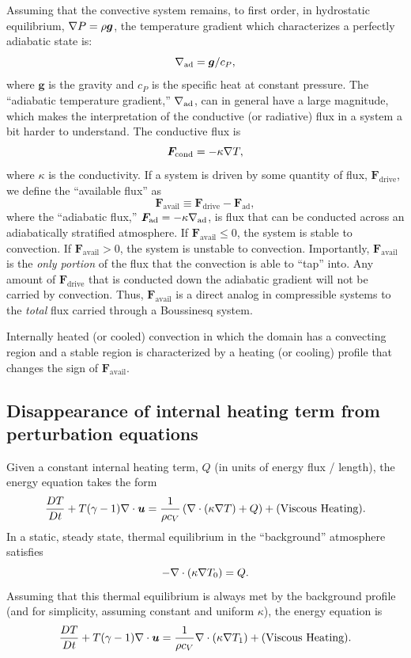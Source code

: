 Assuming that the convective system remains, to first order, in hydrostatic equilibrium, $\nabla P = \rho \bm{g}$, the temperature gradient which characterizes a perfectly adiabatic state is:
\begin{equation}
\nabla_{\text{ad}} = \bm{g}/c_P,
\end{equation}
where $\bm{g}$ is the gravity and $c_P$ is the specific heat at constant pressure.
The ``adiabatic temperature gradient,'' $\nabla_{\text{ad}}$, can in general have a large magnitude, which makes the interpretation of the conductive (or radiative) flux in a system a bit harder to understand.
The conductive flux is
\begin{equation}
\bm{F}_{\text{cond}} = -\kappa \nabla T,
\end{equation}
where $\kappa$ is the conductivity.
If a system is driven by some quantity of flux, $\bm{F}_{\text{drive}}$, we define the ``available flux'' as
\begin{equation}
\bm{F}_{\text{avail}} \equiv \bm{F}_{\text{drive}} - \bm{F}_{\text{ad}},
\end{equation}
where the ``adiabatic flux,'' $\bm{F}_{\text{ad}} = -\kappa\nabla_{\text{ad}}$, is flux that can be conducted across an adiabatically stratified atmosphere.
If $\bm{F}_{\text{avail}} \leq 0$, the system is stable to convection.
If $\bm{F}_{\text{avail}} > 0$, the system is unstable to convection.
Importantly, $\bm{F}_{\text{avail}}$ is the \emph{only portion} of the flux that the convection is able to ``tap'' into.
Any amount of $\bm{F}_{\text{drive}}$ that is conducted down the adiabatic gradient will not be carried by convection.
Thus, $\bm{F}_{\text{avail}}$ is a direct analog in compressible systems to the \emph{total} flux carried through a Boussinesq system.

Internally heated (or cooled) convection in which the domain has a convecting region and a stable region is characterized by a heating (or cooling) profile that changes the sign of $\bm{F}_{\text{avail}}$.

\subsection{Disappearance of internal heating term from perturbation equations}
Given a constant internal heating term, $Q$ (in units of energy flux / length), the energy equation takes the form
\begin{equation}
\frac{D T}{Dt} + T(\gamma-1)\nabla\cdot\bm{u} = \frac{1}{\rho c_V}\left(\nabla\cdot\left( \kappa \nabla T\right) + Q\right) + \text{(Viscous Heating)}.
\end{equation}
In a static, steady state, thermal equilibrium in the ``background'' atmosphere satisfies 
\begin{equation}
-\nabla\cdot\left( \kappa \nabla T_0\right) = Q.
\end{equation}
Assuming that this thermal equilibrium is always met by the background profile (and for simplicity, assuming constant and uniform $\kappa$), the energy equation is
\begin{equation}
\frac{D T}{Dt} + T(\gamma-1)\nabla\cdot\bm{u} = \frac{1}{\rho c_V}\nabla\cdot\left( \kappa \nabla T_1\right) + \text{(Viscous Heating)}.
\label{eqn:energy_noheat}
\end{equation}

